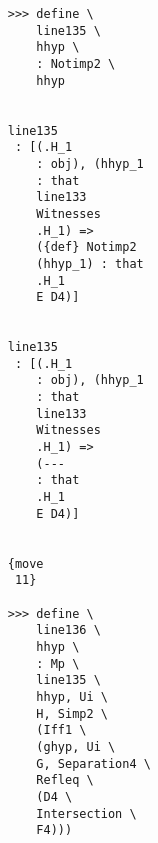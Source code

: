 \documentclass[12pt]{article}
\begin{document}
\begin{verbatim}
                                    >>> define \
                                        line135 \
                                        hhyp \
                                        : Notimp2 \
                                        hhyp


                                    line135 
                                     : [(.H_1 
                                        : obj), (hhyp_1 
                                        : that 
                                        line133 
                                        Witnesses 
                                        .H_1) => 
                                        ({def} Notimp2 
                                        (hhyp_1) : that 
                                        .H_1 
                                        E D4)]


                                    line135 
                                     : [(.H_1 
                                        : obj), (hhyp_1 
                                        : that 
                                        line133 
                                        Witnesses 
                                        .H_1) => 
                                        (--- 
                                        : that 
                                        .H_1 
                                        E D4)]


                                    {move 
                                     11}

                                    >>> define \
                                        line136 \
                                        hhyp \
                                        : Mp \
                                        line135 \
                                        hhyp, Ui \
                                        H, Simp2 \
                                        (Iff1 \
                                        (ghyp, Ui \
                                        G, Separation4 \
                                        Refleq \
                                        (D4 \
                                        Intersection \
                                        F4)))



\end{verbatim}
\end{document}
